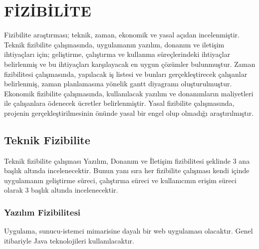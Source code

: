 \chapter{FİZİBİLİTE}
Fizibilite araştırması; teknik, zaman, ekonomik ve yasal açıdan incelenmiştir.
Teknik fizibilite çalışmasında, uygulamanın yazılım, donanım ve iletişim ihtiyaçları
için; geliştirme, çalıştırma ve kullanma süreçlerindeki ihtiyaçlar belirlenmiş ve bu
ihtiyaçları karşılayacak en uygun çözümler bulunmuştur.
Zaman fizibilitesi çalışmasında, yapılacak iş listesi ve bunları gerçekleştirecek çalışanlar
belirlenmiş, zaman planlamasına yönelik gantt diyagramı oluşturulmuştur.
Ekonomik fizibilite çalışmasında, kullanılacak yazılım ve donanımların maliyetleri ile
çalışanlara ödenecek ücretler belirlenmiştir.
Yasal fizibilite çalışmasında, projenin gerçekleştirilmesinin önünde yasal bir engel olup
olmadığı araştırılmıştır.

\section{Teknik Fizibilite}
Teknik fizibilite çalışması Yazılım, Donanım ve İletişim fizibilitesi şeklinde 3 ana
başlık altında incelenecektir. Bunun yanı sıra her fizibilite çalışması kendi içinde
uygulamanın geliştirme süreci, çalıştırma süreci ve kullanıcının erişim süreci olarak 3
başlık altında incelenecektir.

\subsection{Yazılım Fizibilitesi}
Uygulama, sunucu-istemci mimarisine dayalı bir web uygulaması olacaktır. Genel
itibariyle Java teknolojileri kullanılacaktır.
 
